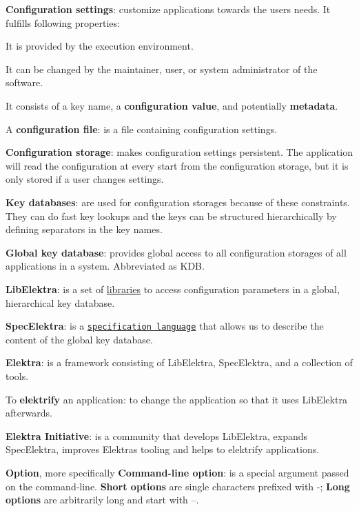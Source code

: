 
\begin{DoxyItemize}
\item {\bfseries Configuration settings}\+: customize applications towards the users\textquotesingle{} needs. It fulfills following properties\+:
\begin{DoxyItemize}
\item It is provided by the execution environment.
\item It can be changed by the maintainer, user, or system administrator of the software.
\item It consists of a key name, a {\bfseries configuration value}, and potentially {\bfseries metadata}.
\end{DoxyItemize}
\item A {\bfseries configuration file}\+: is a file containing configuration settings.
\item {\bfseries Configuration storage}\+: makes configuration settings persistent. The application will read the configuration at every start from the configuration storage, but it is only stored if a user changes settings.
\item {\bfseries Key databases}\+: are used for configuration storages because of these constraints. They can do fast key lookups and the keys can be structured hierarchically by defining separators in the key names.
\item {\bfseries Global key database}\+: provides global access to all configuration storages of all applications in a system. Abbreviated as {\ttfamily K\+DB}.
\item {\bfseries Lib\+Elektra}\+: is a set of \hyperlink{src_libs_README_md}{libraries} to access configuration parameters in a global, hierarchical key database.
\item {\bfseries Spec\+Elektra}\+: is a \href{/home/jenkins/workspace/libelektra-release/doc/METADATA.ini}{\tt specification language} that allows us to describe the content of the global key database.
\item {\bfseries Elektra}\+: is a framework consisting of Lib\+Elektra, Spec\+Elektra, and a collection of tools.
\item To {\bfseries elektrify} an application\+: to change the application so that it uses Lib\+Elektra afterwards.
\item {\bfseries Elektra Initiative}\+: is a community that develops Lib\+Elektra, expands Spec\+Elektra, improves Elektra\textquotesingle{}s tooling and helps to elektrify applications.
\item {\bfseries Option}, more specifically {\bfseries Command-\/line option}\+: is a special argument passed on the command-\/line. {\bfseries Short options} are single characters prefixed with \textquotesingle{}-\/\textquotesingle{}; {\bfseries Long options} are arbitrarily long and start with \textquotesingle{}--\textquotesingle{}.
\end{DoxyItemize}



